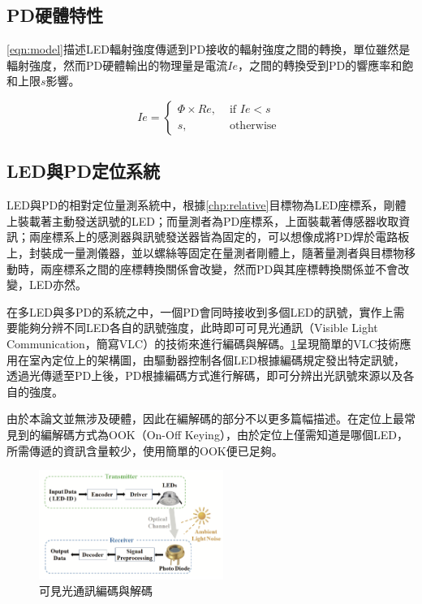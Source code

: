     
    \subsection{PD硬體特性}

    \ref{eqn:model}描述LED輻射強度傳遞到PD接收的輻射強度之間的轉換，單位雖然是輻射強度，然而PD硬體輸出的物理量是電流$Ie$，之間的轉換受到PD的響應率和飽和上限$s$影響。


    \begin{equation}
        \label{eqn:current}
        Ie = \begin{cases}\Phi\times Re, & \text { if } Ie<s \\ s, & \text { otherwise }\end{cases}
    \end{equation}

        
    

        



    \subsection{LED與PD定位系統}

        LED與PD的相對定位量測系統中，根據\ref{chp:relative}目標物為LED座標系，剛體上裝載著主動發送訊號的LED；而量測者為PD座標系，上面裝載著傳感器收取資訊；兩座標系上的感測器與訊號發送器皆為固定的，可以想像成將PD焊於電路板上，封裝成一量測儀器，並以螺絲等固定在量測者剛體上，隨著量測者與目標物移動時，兩座標系之間的座標轉換關係會改變，然而PD與其座標轉換關係並不會改變，LED亦然。

        
        在多LED與多PD的系統之中，一個PD會同時接收到多個LED的訊號，實作上需要能夠分辨不同LED各自的訊號強度，此時即可可見光通訊（Visible Light Communication，簡寫VLC）的技術\cite{vlc}來進行編碼與解碼。\ref{pic:vlc}呈現簡單的VLC技術應用在室內定位上的架構圖，由驅動器控制各個LED根據編碼規定發出特定訊號，透過光傳遞至PD上後，PD根據編碼方式進行解碼，即可分辨出光訊號來源以及各自的強度。
        
        由於本論文並無涉及硬體，因此在編解碼的部分不以更多篇幅描述。在定位上最常見到的編解碼方式為OOK（On-Off Keying），由於定位上僅需知道是哪個LED，所需傳遞的資訊含量較少，使用簡單的OOK便已足夠。
        
        \begin{figure}[ht]
            \centering
            \includegraphics[width=6cm]{ch2pic/vlc.png}
            \caption{可見光通訊編碼與解碼\cite{decoding}}
            \label{pic:vlc}
        \end{figure}


